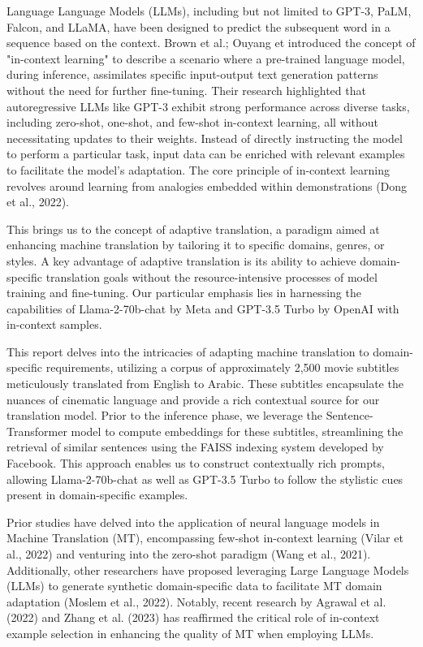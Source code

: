 \documentclass{article}
\begin{document}
Language Language Models (LLMs), including but not limited to GPT-3\cite{brown2020language}, PaLM\cite{chowdhery2022palm}, Falcon\cite{penedo2023refinedweb}, and LLaMA\cite{touvron2023llama}, have been designed to predict the subsequent word in a sequence based on the context. Brown et al.\cite{brown2020language}; Ouyang et\cite{ouyang2022training} introduced the concept of "in-context learning" to describe a scenario where a pre-trained language model, during inference, assimilates specific input-output text generation patterns without the need for further fine-tuning. Their research highlighted that autoregressive LLMs like GPT-3 exhibit strong performance across diverse tasks, including zero-shot, one-shot, and few-shot in-context learning, all without necessitating updates to their weights. Instead of directly instructing the model to perform a particular task, input data can be enriched with relevant examples to facilitate the model's adaptation. The core principle of in-context learning revolves around learning from analogies embedded within demonstrations (Dong et al., 2022).




This brings us to the concept of adaptive translation, a paradigm aimed at enhancing machine translation by tailoring it to specific domains, genres, or styles. A key advantage of adaptive translation is its ability to achieve domain-specific translation goals without the resource-intensive processes of model training and fine-tuning. Our particular emphasis lies in harnessing the capabilities of Llama-2-70b-chat by Meta and GPT-3.5 Turbo by OpenAI with in-context samples.

This report delves into the intricacies of adapting machine translation to domain-specific requirements, utilizing a corpus of approximately 2,500 movie subtitles meticulously translated from English to Arabic. These subtitles encapsulate the nuances of cinematic language and provide a rich contextual source for our translation model. Prior to the inference phase, we leverage the Sentence-Transformer model to compute embeddings for these subtitles, streamlining the retrieval of similar sentences using the FAISS indexing system developed by Facebook. This approach enables us to construct contextually rich prompts, allowing Llama-2-70b-chat as well as GPT-3.5 Turbo to follow the stylistic cues present in domain-specific examples.

Prior studies have delved into the application of neural language models in Machine Translation (MT), encompassing few-shot in-context learning (Vilar et al., 2022) and venturing into the zero-shot paradigm (Wang et al., 2021). Additionally, other researchers have proposed leveraging Large Language Models (LLMs) to generate synthetic domain-specific data to facilitate MT domain adaptation (Moslem et al., 2022). Notably, recent research by Agrawal et al. (2022) and Zhang et al. (2023) has reaffirmed the critical role of in-context example selection in enhancing the quality of MT when employing LLMs.
\end{document}
